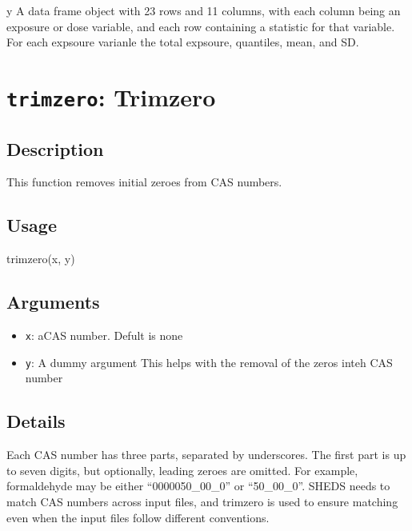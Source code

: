 \documentclass[
]{article}
\newenvironment{Shaded}{\begin{snugshade}}{\end{snugshade}}
\newcommand{\FunctionTok}[1]{\textcolor[rgb]{0.00,0.00,0.00}{#1}}
\newcommand{\NormalTok}[1]{#1}
\providecommand{\tightlist}{%
  \setlength{\itemsep}{0pt}\setlength{\parskip}{0pt}}
\begin{document}
y A data frame object with 23 rows and 11 columns, with each column
being an exposure or dose variable, and each row containing a statistic
for that variable. For each expsoure varianle the total expsoure,
quantiles, mean, and SD.

\hypertarget{trimzero-trimzero}{%
\section{\texorpdfstring{\texttt{trimzero}:
Trimzero}{trimzero: Trimzero}}\label{trimzero-trimzero}}

\hypertarget{description-54}{%
\subsection{Description}\label{description-54}}

This function removes initial zeroes from CAS numbers.

\hypertarget{usage-54}{%
\subsection{Usage}\label{usage-54}}

\begin{Shaded}
\begin{Highlighting}[]
\FunctionTok{trimzero}\NormalTok{(x, y)}
\end{Highlighting}
\end{Shaded}

\hypertarget{arguments-39}{%
\subsection{Arguments}\label{arguments-39}}

\begin{itemize}
\tightlist
\item
  \texttt{x}: aCAS number. Defult is none
\item
  \texttt{y}: A dummy argument This helps with the removal of the zeros
  inteh CAS number
\end{itemize}

\hypertarget{details-31}{%
\subsection{Details}\label{details-31}}

Each CAS number has three parts, separated by underscores. The first
part is up to seven digits, but optionally, leading zeroes are omitted.
For example, formaldehyde may be either ``0000050\_00\_0'' or
``50\_00\_0''. SHEDS needs to match CAS numbers across input files, and
trimzero is used to ensure matching even when the input files follow
different conventions.
\end{document}
